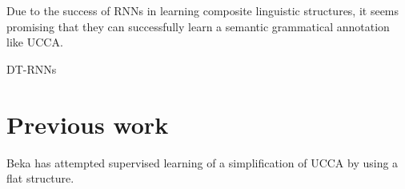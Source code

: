 \documentclass[11pt]{article} \usepackage{cite}
\begin{document}
Due to the success of RNNs in learning composite linguistic structures, it seems
promising that they can successfully learn a semantic grammatical annotation
like UCCA.

DT-RNNs


\section{Previous work}

Beka \cite{beka2013thesis} has attempted supervised learning of a simplification
of UCCA by using a flat structure.


{}  
\end{document}
